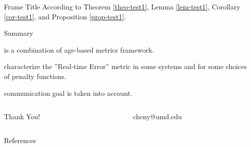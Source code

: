 \documentclass[notheorems, aspectratio=169]{beamer}
\begin{document}
\begin{frame}{Frame Title}
According to Theorem \ref{theo-test1}, Lemma \ref{lem-test1}, Corollary \ref{cor-test1}, and Proposition \ref{prop-test1}.

\end{frame}

\begin{frame}[plain]{Summary}
\begin{description}
	\item[Combination] is a combination of age-based metrics framework.
    \item[Sufficiency] characterize the ”Real-time Error” metric in some systems and for some choices of penalty functions.
    \item[Semantic] communication goal is taken into account.
\end{description}

\vfill
\begin{columns}
\begin{column}{0.5\textwidth}
	\centering \huge
	\textcolor{MyBlue}{Thank You!}
\end{column}
\textcolor{gray!80!white}{\vrule{}}
\begin{column}{0.5\textwidth} 
	\centering \Large
	\textcolor{MyBlue}{cheny@umd.edu}
\end{column}
\end{columns}
\end{frame}

\begin{frame}[plain]{References}


\end{frame}
\end{document}
